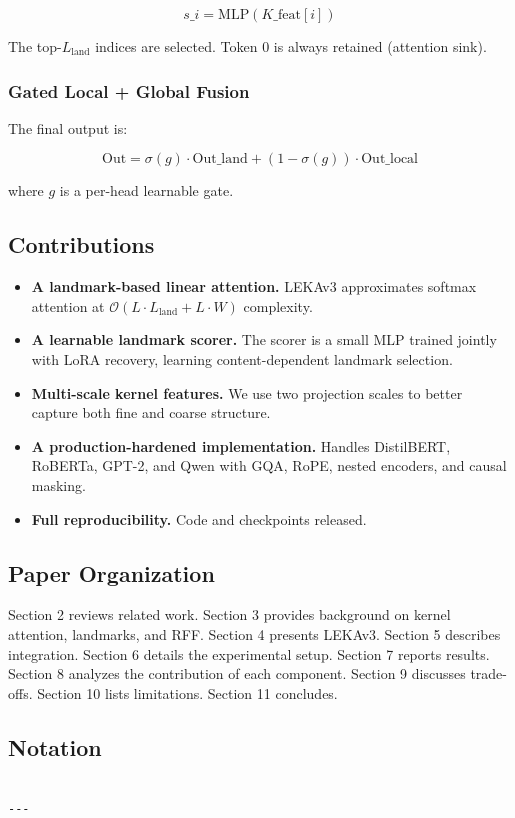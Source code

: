 \[
s\_i = \text{MLP}(K\_\text{feat}[i])
\tag{1.5}
\]

The top-$L_\text{land}$ indices are selected. Token 0 is always retained 
(attention sink).

\subsubsection{Gated Local + Global Fusion}

The final output is:

\[
\text{Out} = \sigma(g) \cdot \text{Out}\_\text{land} + (1 - \sigma(g)) \cdot \text{Out}\_\text{local}
\tag{1.6}
\]

where $g$ is a per-head learnable gate.

\subsection{Contributions}

\begin{itemize}
\item \textbf{A landmark-based linear attention.} LEKAv3 approximates softmax attention
  at $\mathcal{O}(L \cdot L_\text{land} + L \cdot W)$ complexity.
\item \textbf{A learnable landmark scorer.} The scorer is a small MLP trained jointly
  with LoRA recovery, learning content-dependent landmark selection.
\item \textbf{Multi-scale kernel features.} We use two projection scales to better
  capture both fine and coarse structure.
\item \textbf{A production-hardened implementation.} Handles DistilBERT, RoBERTa,
  GPT-2, and Qwen with GQA, RoPE, nested encoders, and causal masking.
\item \textbf{Full reproducibility.} Code and checkpoints released.

\end{itemize}
\subsection{Paper Organization}

Section 2 reviews related work. Section 3 provides background on kernel 
attention, landmarks, and RFF. Section 4 presents LEKAv3. Section 5 
describes integration. Section 6 details the experimental setup. Section 7 
reports results. Section 8 analyzes the contribution of each component. 
Section 9 discusses trade-offs. Section 10 lists limitations. Section 11 
concludes.



\subsection{Notation}

\begin{lstlisting}

---
\end{lstlisting}